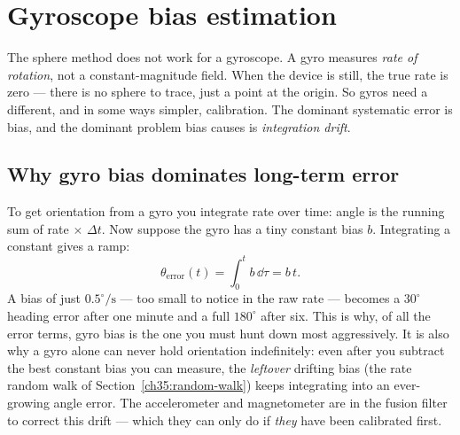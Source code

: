 \section{Gyroscope bias estimation}
\label{ch35:gyro-bias}

The sphere method does not work for a gyroscope. A gyro measures \emph{rate of rotation}, not a constant-magnitude
field. When the device is still, the true rate is zero --- there is no sphere to
trace, just a point at the origin. So gyros need a different, and in some ways
simpler, calibration. The dominant systematic error is bias, and the dominant
problem bias causes is \emph{integration drift}.

\subsection{Why gyro bias dominates long-term error}
\label{ch35:gyro-drift}

To get orientation from a gyro you integrate rate over time: angle is the running
sum of rate $\times$ $\Delta t$. Now suppose the gyro has a tiny constant bias
$b$. Integrating a constant gives a ramp:
\begin{equation}
  \theta_{\text{error}}(t) = \int_0^t b \, \dd\tau = b\,t.
  \label{ch35:bias-integrates}
\end{equation}
A bias of just $0.5^\circ/\mathrm{s}$ --- too small to notice in the raw rate ---
becomes a $30^\circ$ heading error after one minute and a full $180^\circ$ after
six. This is why, of all the error terms, gyro bias is the one you must hunt down
most aggressively. It is also why a gyro alone can never hold orientation
indefinitely: even after you subtract the best constant bias you can measure, the
\emph{leftover} drifting bias (the rate random walk of
Section~\ref{ch35:random-walk}) keeps integrating into an ever-growing angle
error. The accelerometer and magnetometer are in the fusion filter to
correct this drift --- which they can only do if \emph{they} have been
calibrated first.

